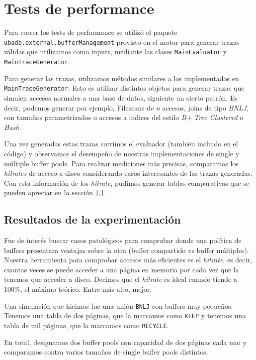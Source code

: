 \section{Tests de performance}
Para correr los tests de performance se utiliz\'o el paquete \texttt{ubadb.external.bufferManagement} provisto en el
motor para generar trazas v\'alidas que utilizamos como inputs, mediante las clases \texttt{MainEvaluator} y \texttt{MainTraceGenerator}.

Para generar las trazas, utilizamos m\'etodos similares a los implementados en \texttt{MainTraceGenerator}. Esto es
utilizar distintos objetos para generar trazas que simulen accesos normales a una base de datos, siguiente un cierto
patr\'on. Es decir, podemos generar por ejemplo, Filescans de \textit{n} accesos, joins de tipo \textit{BNLJ}, con
tama\~nos parametrizados o accesos a indices del estilo \textit{B+ Tree Clustered} o \textit{Hash}.

Una vez generadas estas trazas corrimos el evaluador (tambi\'en incluido en el c\'odigo) y observamos el
desempe\~no de nuestras implementaciones de single y m\'ultiple buffer pools. Para realizar mediciones m\'as
precisas, comparamos los \textit{hitrates} de acceso a disco considerando casos interesantes de las trazas generadas.
Con esta informaci\'on de los \textit{hitrate}, pudimos generar tablas comparativas que se pueden apreciar en la secci\'on \ref{secTablas}.


\subsection{Resultados de la experimentaci\'on}\label{secTablas}

Fue de inter\'es buscar casos patol\'ogicos para comprobar donde una pol\'itica de
buffers presentara ventajas sobre la otra (buffer compartido vs buffer m\'ultiples).
Nuestra herramienta para comprobar accesos m\'as eficientes es el \textit{hitrate},
es decir, cuantas veces se puede acceder a una p\'agina en memoria por cada vez que
la tenemos que acceder a disco. Decimos que el \textit{hitrate} es ideal cuando
tiende a 100\%, el m\'aximo te\'orico. Entre m\'as alto, mejor.

Una simulaci\'on que hicimos fue una uni\'on \texttt{BNLJ} con buffers muy peque\~nos.
Tenemos una tabla de dos p\'aginas, que la marcamos como \texttt{KEEP} y tenemos
una tabla de mil p\'aginas, que la marcamos como \texttt{RECYCLE}.

En total, designamos dos buffer pools con capacidad de dos p\'aginas cada uno
y comparamos contra varios tama\~nos de single buffer pools distintos.

